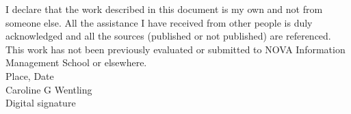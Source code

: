 I declare that the work described in this document is my own and not from someone else. All the assistance I have received from other people is duly acknowledged and all the sources (published or not published) are referenced.\\

This work has not been previously evaluated or submitted to NOVA Information Management School or elsewhere.\\

{\color{red} Place, Date}\\

Caroline G Wentling\\

{\color{red} Digital signature}\\